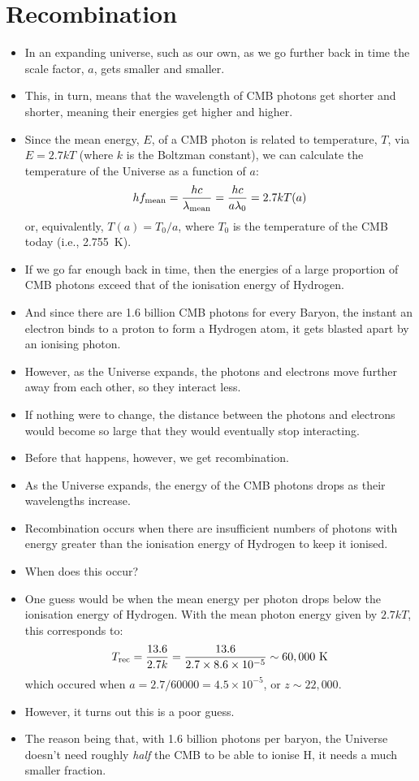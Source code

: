 \documentclass[11pt]{article}
\begin{document}
\section{Recombination}
\begin{itemize}
\item In an expanding universe, such as our own, as we go further back in time the scale factor, $a$, gets smaller and smaller.
\item This, in turn, means that the wavelength of CMB photons get shorter and shorter, meaning their energies get higher and higher.
\item Since the mean energy, $E$, of a CMB photon is related to temperature, $T$, via $E=2.7kT$ (where $k$ is the Boltzman constant), we can calculate the temperature of the Universe as a function of $a$:
\begin{equation}
    hf_{\rm mean}=\frac{hc}{\lambda_{\rm mean}}=\frac{hc}{a\lambda_0} = 2.7kT(a)
\end{equation}
or, equivalently, $T(a) = T_0/a$, where $T_0$ is the temperature of the CMB today (i.e., 2.755\ K).
\item If we go far enough back in time, then the energies of a large proportion of CMB photons exceed that of the ionisation energy of Hydrogen.
\item And since there are 1.6 billion CMB photons for every Baryon, the instant an electron binds to a proton to form a Hydrogen atom, it gets blasted apart by an ionising photon.
\item However, as the Universe expands, the photons and electrons move further away from each other, so they interact less.
\item If nothing were to change, the distance between the photons and electrons would become so large that they would eventually stop interacting.
\item Before that happens, however, we get recombination.
\item As the Universe expands, the energy of the CMB photons drops as their wavelengths increase.
\item Recombination occurs when there are insufficient numbers of photons with energy greater than the ionisation energy of Hydrogen to keep it ionised.
\item When does this occur?
\item One guess would be when the mean energy per photon drops below the ionisation energy of Hydrogen. With the mean photon energy given by $2.7kT$, this corresponds to:
\begin{equation}
T_{\rm rec} = \frac{13.6}{2.7k}=\frac{13.6}{2.7\times8.6\times10^{-5}}\sim60,000~{\rm K}
\end{equation}
which occured when $a=2.7/60000=4.5\times10^{-5}$, or $z\sim22,000$.
\item However, it turns out this is a poor guess.
\item The reason being that, with 1.6 billion photons per baryon, the Universe doesn't need roughly {\it half} the CMB to be able to ionise H, it needs a much smaller fraction.
\end{itemize}
\end{document}
